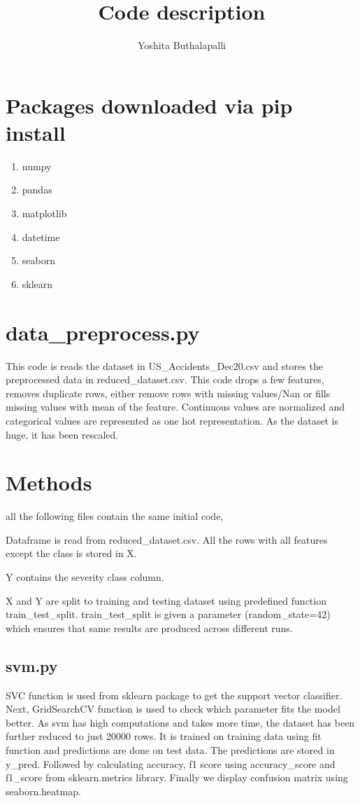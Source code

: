 \documentclass{article}
\title{Code description}
\author{Yoshita Buthalapalli}
\begin{document}
\date{}
\maketitle
\section*{Packages downloaded via pip install}
\begin{enumerate}
    \item numpy
    \item pandas
    \item matplotlib
    \item datetime
    \item seaborn
    \item sklearn
\end{enumerate}

\section{data\_preprocess.py}

This code is reads the dataset in US\_Accidents\_Dec20.csv and stores the preprocessed data in reduced\_dataset.csv. This code drops a few features, removes duplicate rows, either remove rows with missing values/Nan or fills missing values with mean of the feature. Continuous values are normalized and categorical values are represented as one hot representation. As the dataset is huge, it has been rescaled.

\section{Methods}
all the following files contain the same initial code,

Dataframe is read from reduced\_dataset.csv. 
All the rows with all features except the class is stored in X.

Y contains the severity class column.

X and Y are split to training and testing dataset using predefined function train\_test\_split. train\_test\_split is given a parameter (random\_state=42) which ensures that same results are produced across different runs.
\subsection{svm.py}
SVC function is used from sklearn package to get the support vector classifier. Next, GridSearchCV function is used to check which parameter fits the model better.
As svm has high computations and takes more time, the dataset has been further reduced to just 20000 rows. It is trained on training data using fit function and predictions are done on test data. The predictions are stored in y\_pred.
Followed by calculating accuracy, f1 score using accuracy\_score and f1\_score from sklearn.metrics library. Finally we display confusion matrix using seaborn.heatmap.
\end{document}
